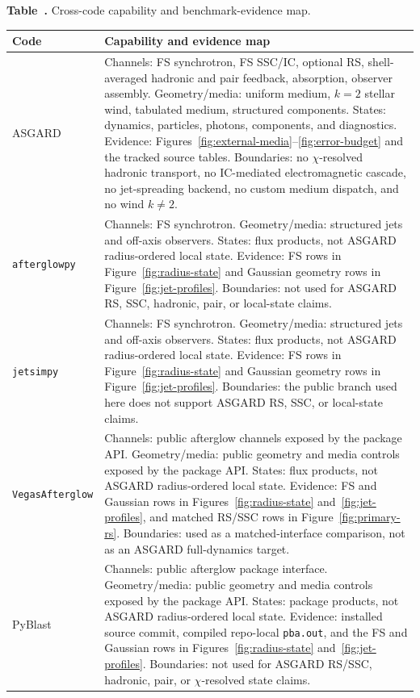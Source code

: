 \documentclass[twocolumn]{aastex702}
\newcommand{\afterglowpy}{\texttt{afterglowpy}}
\newcommand{\jetsimpy}{\texttt{jetsimpy}}
\newcommand{\vegas}{\texttt{VegasAfterglow}}
\begin{document}
\begin{center}
\label{tab:cross-code-capabilities}
\small \textbf{Table~\thetable.} Cross-code capability and benchmark-evidence map.
\vspace{0.6ex}

\scriptsize
\setlength{\tabcolsep}{3pt}
\renewcommand{\arraystretch}{1.18}
\begin{tabular}{p{}p{}}
\hline
Code & Capability and evidence map\\
\hline
ASGARD & Channels: FS synchrotron, FS SSC/IC, optional RS, shell-averaged hadronic and pair feedback, absorption, observer assembly.  Geometry/media: uniform medium, \(k=2\) stellar wind, tabulated medium, structured components.  States: dynamics, particles, photons, components, and diagnostics.  Evidence: Figures~\ref{fig:external-media}--\ref{fig:error-budget} and the tracked source tables.  Boundaries: no \(\chi\)-resolved hadronic transport, no IC-mediated electromagnetic cascade, no jet-spreading backend, no custom medium dispatch, and no wind \(k\ne2\).\\
\afterglowpy & Channels: FS synchrotron.  Geometry/media: structured jets and off-axis observers.  States: flux products, not ASGARD radius-ordered local state.  Evidence: FS rows in Figure~\ref{fig:radius-state} and Gaussian geometry rows in Figure~\ref{fig:jet-profiles}.  Boundaries: not used for ASGARD RS, SSC, hadronic, pair, or local-state claims.\\
\jetsimpy & Channels: FS synchrotron.  Geometry/media: structured jets and off-axis observers.  States: flux products, not ASGARD radius-ordered local state.  Evidence: FS rows in Figure~\ref{fig:radius-state} and Gaussian geometry rows in Figure~\ref{fig:jet-profiles}.  Boundaries: the public branch used here does not support ASGARD RS, SSC, or local-state claims.\\
\vegas & Channels: public afterglow channels exposed by the package API.  Geometry/media: public geometry and media controls exposed by the package API.  States: flux products, not ASGARD radius-ordered local state.  Evidence: FS and Gaussian rows in Figures~\ref{fig:radius-state} and~\ref{fig:jet-profiles}, and matched RS/SSC rows in Figure~\ref{fig:primary-rs}.  Boundaries: used as a matched-interface comparison, not as an ASGARD full-dynamics target.\\
PyBlast & Channels: public afterglow package interface.  Geometry/media: public geometry and media controls exposed by the package API.  States: package products, not ASGARD radius-ordered local state.  Evidence: installed source commit, compiled repo-local \texttt{pba.out}, and the FS and Gaussian rows in Figures~\ref{fig:radius-state} and~\ref{fig:jet-profiles}.  Boundaries: not used for ASGARD RS/SSC, hadronic, pair, or \(\chi\)-resolved state claims.\\
\hline
\end{tabular}
\end{center}
\end{document}
